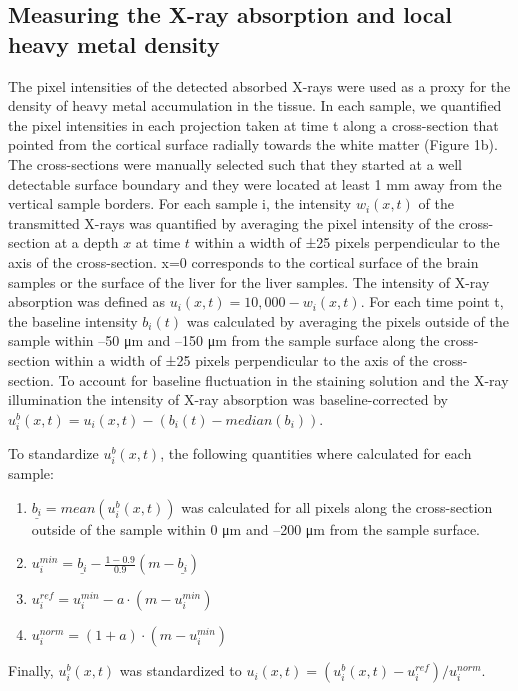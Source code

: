 \documentclass{article}
\begin{document}
\subsection*{Measuring the X-ray absorption and local heavy metal density}
The pixel intensities of the detected absorbed X-rays were used as a proxy for the density of heavy metal accumulation in the tissue. In each sample, we quantified the pixel intensities in each projection taken at time t along a cross-section that pointed from the cortical surface radially towards the white matter (Figure 1b). The cross-sections were manually selected such that they started at a well detectable surface boundary and they were located at least 1 mm away from the vertical sample borders. For each sample i, the intensity $w_{i}\left(x,t\right)$ of the transmitted X-rays was quantified by averaging the pixel intensity of the cross-section at a depth $x$ at time $t$ within a width of ±25 pixels perpendicular to the axis of the cross-section. x=0 corresponds to the cortical surface of the brain samples or the surface of the liver for the liver samples. The intensity of X-ray absorption was defined as $u_{i}\left(x,t\right) = 10,000 - w_{i}\left(x,t\right)$. For each time point t, the baseline intensity $b_{i}\left(t\right)$ was calculated by averaging the pixels outside of the sample within –50 μm and –150 μm from the sample surface along the cross-section within a width of ±25 pixels perpendicular to the axis of the cross-section. To account for baseline fluctuation in the staining solution and the X-ray illumination the intensity of X-ray absorption was baseline-corrected by $u_{i}^{b}\left(x,t\right) = u_{i}\left(x,t\right) - \left(b_{i}\left(t\right) - median\left(b_{i}\right)\right)$.

To standardize $u_{i}^{b}\left(x,t\right)$, the following quantities where calculated for each sample:
\begin{enumerate}
\item $\underline{b_{i}} = mean\left(u_{i}^{b}\left(x,t\right)\right)$ was calculated for all pixels along the cross-section outside of the sample within 0 μm and –200 μm from the sample surface.
\item $u_{i}^{min} = \underline{b_{i}} - \frac{1-0.9}{0.9}\left(m - \underline{b_{i}}\right)$
\item $u_{i}^{ref} = u_{i}^{min} - a\cdot\left(m - u_{i}^{min}\right)$
\item $u_{i}^{norm} = \left(1+a\right)\cdot\left(m - u_{i}^{min}\right)$
\end{enumerate}
Finally, $u_{i}^{b}\left(x,t\right)$ was standardized to $u_{i}\left(x,t\right) = \left(u_{i}^{b}\left(x,t\right) - u_{i}^{ref}\right)/u_{i}^{norm}$.
\end{document}
